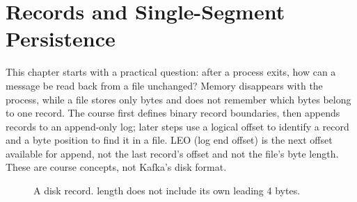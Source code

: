 \chapter{Records and Single-Segment Persistence}
This chapter starts with a practical question: after a process exits, how can a message be read back from a file unchanged? Memory disappears with the process, while a file stores only bytes and does not remember which bytes belong to one record. The course first defines binary record boundaries, then appends records to an append-only log; later steps use a logical offset to identify a record and a byte position to find it in a file. LEO (log end offset) is the next offset available for append, not the last record's offset and not the file's byte length. These are course concepts, not Kafka's disk format.

\begin{figure}[ht]
\centering
{}
\caption{A disk record. length does not include its own leading 4 bytes.}
\end{figure}

